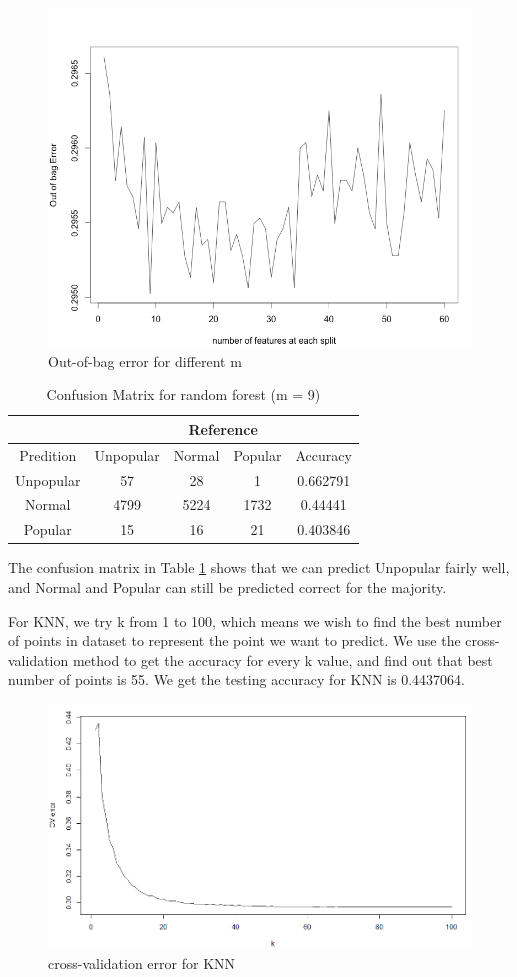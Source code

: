 \documentclass[11pt]{article}
\begin{document}
    \begin{figure}[h]
        \centering
        \includegraphics[width=0.7\linewidth]{randomforest_oob.png}
        \caption{Out-of-bag error for different m}
    \end{figure}
    
    \begin{table}[h]
        \centering
        \caption{Confusion Matrix for random forest (m = 9)}
        \begin{tabular}{ c | c | c | c | c }
            \hline\hline
            {} & \multicolumn{4}{c}{Reference} \\
            \hline
            Predition & Unpopular & Normal & Popular & Accuracy\\
            \hline
            Unpopular & 57 & 28 & 1 & 0.662791\\
            \hline
            Normal & 4799 & 5224 & 1732 & 0.44441\\
            \hline
            Popular & 15 & 16 & 21 & 0.403846\\
            \hline\hline
        \end{tabular}
        \label{table:rf}
    \end{table}

The confusion matrix in Table \ref{table:rf} shows that we can predict Unpopular fairly well, and Normal and Popular can still be predicted correct for the majority.

For KNN, we try k from 1 to 100, which means we wish to find the best number of points in dataset to represent the point we want to predict. We use the cross-validation method to get the accuracy for every k value, and find out that best number of points is 55. We get the testing accuracy for KNN is 0.4437064.

    \begin{figure}[h]
        \centering
        \includegraphics[width=0.639\linewidth]{knn_cv.png}
        \caption{cross-validation error for KNN}
    \end{figure}
\end{document}

